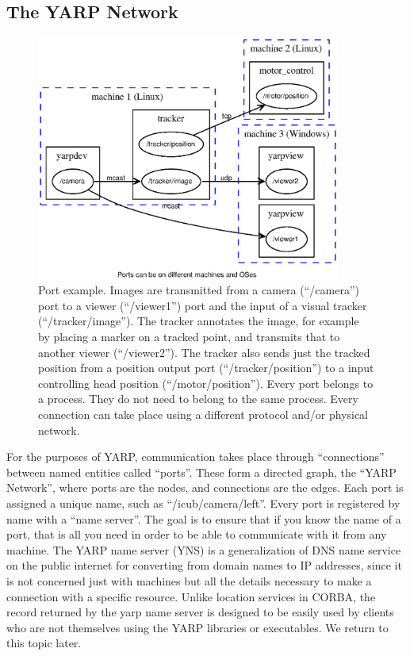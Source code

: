 \subsection{The YARP Network}


\begin{figure}[t]
\centerline{
\includegraphics[width=10cm]{fig-ports}
}
\caption{
%
\label{fig:yarp-network}
%
Port example.
Images are transmitted from a camera (``/camera'') port to a viewer
(``/viewer1'') port and the input of a visual tracker
(``/tracker/image''). The tracker annotates the image, for example by
placing a marker on a tracked point, and transmits that to another
viewer (``/viewer2''). The tracker also sends just the tracked position
from a position output port (``/tracker/position'') to a input
controlling head position (``/motor/position''). Every port belongs to a
process. They do not need to belong to the same process. Every
connection can take place using a different protocol and/or physical
network.
%
}
\end{figure}

For the purposes of YARP, communication takes place through
``connections'' between named entities called ``ports''. These form a
directed graph, the ``YARP Network'', where ports are the nodes, and
connections are the edges.
%
Each port is assigned a unique name, such as
``/icub/camera/left''. Every port is registered by name with a ``name
server''. The goal is to ensure that if you know the name of a port,
that is all you need in order to be able to communicate with it from
any machine.  The YARP name server (YNS) is a generalization of DNS
name service on the public internet for converting from domain names
to IP addresses, since it is not concerned just with machines but all
the details necessary to make a connection with a specific resource.
Unlike location services in CORBA, the record returned by the yarp
name server is designed to be easily used by clients who are not
themselves using the YARP libraries or executables.  We return to this
topic later.

